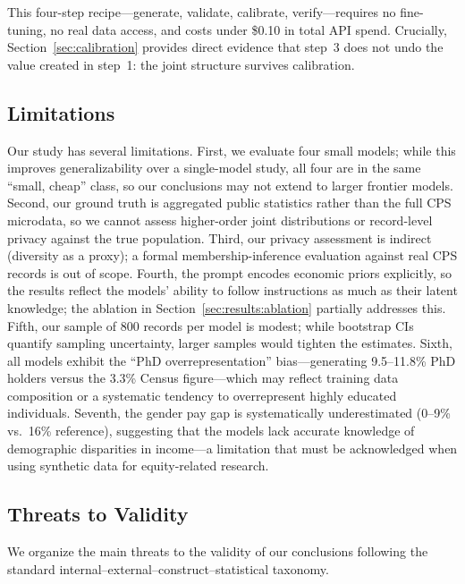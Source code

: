 \documentclass[11pt]{article}
\begin{document}
This four-step recipe---generate, validate, calibrate, verify---requires no fine-tuning, no real data access, and costs under \$0.10 in total API spend.
Crucially, Section~\ref{sec:calibration} provides direct evidence that step~3 does not undo the value created in step~1: the joint structure survives calibration.

\subsection{Limitations}

Our study has several limitations.
First, we evaluate four small models; while this improves generalizability over a single-model study, all four are in the same ``small, cheap'' class, so our conclusions may not extend to larger frontier models.
Second, our ground truth is aggregated public statistics rather than the full CPS microdata, so we cannot assess higher-order joint distributions or record-level privacy against the true population.
Third, our privacy assessment is indirect (diversity as a proxy); a formal membership-inference evaluation against real CPS records is out of scope.
Fourth, the prompt encodes economic priors explicitly, so the results reflect the models' ability to follow instructions as much as their latent knowledge; the ablation in Section~\ref{sec:results:ablation} partially addresses this.
Fifth, our sample of 800 records per model is modest; while bootstrap CIs quantify sampling uncertainty, larger samples would tighten the estimates.
Sixth, all models exhibit the ``PhD overrepresentation'' bias---generating 9.5--11.8\% PhD holders versus the 3.3\% Census figure---which may reflect training data composition or a systematic tendency to overrepresent highly educated individuals.
Seventh, the gender pay gap is systematically underestimated (0--9\% vs.\ 16\% reference), suggesting that the models lack accurate knowledge of demographic disparities in income---a limitation that must be acknowledged when using synthetic data for equity-related research.

\subsection{Threats to Validity}

We organize the main threats to the validity of our conclusions following the standard internal--external--construct--statistical taxonomy.
\end{document}
